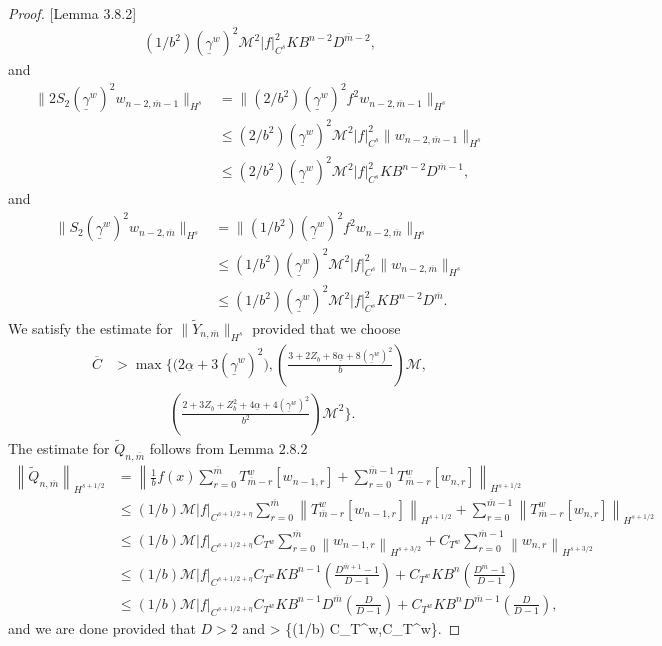 \begin{proof}{[Lemma 3.8.2]}
\begin{align*}
(1/b^2)(\underline{\gamma}^w)^2\mathcal{M}^2|f|_{C^{s}}^2KB^{n-2}D^{\overline{m}-2},
\end{align*}
and
\begin{align*}
\|2S_2(\underline{\gamma}^w)^2w_{n-2,\overline{m}-1}\|_{H^{s}}&=\|(2/b^2)(\underline{\gamma}^w)^2f^2w_{n-2,\overline{m}-1}\|_{H^{s}}\\&\le
(2/b^2)(\underline{\gamma}^w)^2\mathcal{M}^2|f|_{C^{s}}^2\|w_{n-2, \overline{m}-1}\|_{H^{s}}\\&\le
(2/b^2)(\underline{\gamma}^w)^2\mathcal{M}^2|f|_{C^{s}}^2KB^{n-2}D^{\overline{m}-1},
\end{align*}
and
\begin{align*}
\|S_2(\underline{\gamma}^w)^2w_{n-2,\overline{m}}\|_{H^{s}}&=\|(1/b^2)(\underline{\gamma}^w)^2f^2w_{n-2,\overline{m}}\|_{H^{s}}\\&\le
(1/b^2)(\underline{\gamma}^w)^2\mathcal{M}^2|f|_{C^{s}}^2\|w_{n-2, \overline{m}}\|_{H^{s}}\\&\le
(1/b^2)(\underline{\gamma}^w)^2\mathcal{M}^2|f|_{C^{s}}^2KB^{n-2}D^{\overline{m}}.
\end{align*}
We satisfy the estimate for $\|\tilde{Y}_{n,\overline{m}}\|_{H^{s}}$ provided that we choose
\begin{align*}\overline{C} &> \max\Bigg\{\bigg(2\underline{\alpha}+3(\underline{\gamma}^w)^2\bigg),\left(\frac{3+2Z_b+8\underline{\alpha}+8(\underline{\gamma}^w)^2}{b}\right)\mathcal{M},\\&\qquad\qquad\left(\frac{2+3Z_b+Z^2_b+4\underline{\alpha}+4(\underline{\gamma}^w)^2}{b^2} \right)\mathcal{M}^2    \Bigg\}.\end{align*}
The estimate for $\tilde{Q}_{n,\overline{m}}$ follows from Lemma $2.8.2$
\begin{align*}
\left\|\tilde{Q}_{n,\overline{m}}\right\|_{H^{s+1/2}}&=\left\|\frac{1}{b} f(x) \sum_{r=0}^{\overline{m}} T^w_{\overline{m}-r}\left[w_{n-1,r}\right] + \sum_{r=0}^{\overline{m}-1}T_{\overline{m}-r}^w\left[w_{n,r}\right]\right\|_{H^{s+1/2}}\\&\le
(1/b)\mathcal{M}|f|_{C^{s+1/2+\eta}}\sum_{r=0}^{\overline{m}}\left\|T^w_{\overline{m}-r}\left[w_{n-1,r}\right]\right\|_{H^{s+1/2}}+
\sum_{r=0}^{\overline{m}-1}\left\|T^w_{\overline{m}-r}\left[w_{n,r}\right]\right\|_{H^{s+1/2}}
\\&\le
(1/b)\mathcal{M}|f|_{C^{s+1/2+\eta}}C_{T^w}\sum_{r=0}^{\overline{m}}\left\|w_{n-1,r}\right\|_{H^{s+3/2}}+
C_{T^w}\sum_{r=0}^{\overline{m}-1}\left\|w_{n,r}\right\|_{H^{s+3/2}}
\\&\le
(1/b)\mathcal{M}|f|_{C^{s+1/2+\eta}} C_{T^w} KB^{n-1}\left(\frac{D^{\overline{m}+1}-1}{D-1}\right) + C_{T^w}KB^{n}\left(\frac{D^{\overline{m}}-1}{D-1}\right)
\\&\le
(1/b)\mathcal{M}|f|_{C^{s+1/2+\eta}} C_{T^w} KB^{n-1}D^{\overline{m}}\left(\frac{D}{D-1}\right) + C_{T^w}KB^{n}D^{\overline{m}-1}\left(\frac{D}{D-1}\right),
\end{align*}
and we are done provided that $D>2$ and 
\bes
{} > \max\big\{(1/b) C_{T^w},C_{T^w}\big\}.
\qedhere
\ees
\end{proof}

